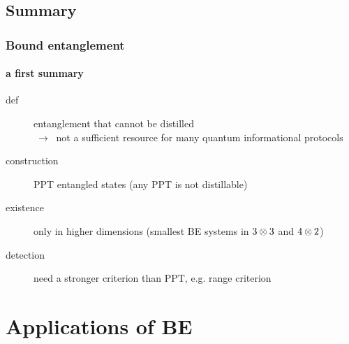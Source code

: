 \documentclass[compress,notes=hide]{beamer}
\begin{document}
\subsection{Summary}

\begin{frame}
\frametitle{Bound entanglement}
\framesubtitle{a first summary}

\begin{description}
  \item[def] entanglement that cannot be distilled \\ \pause $\ \rightarrow \ $ not a sufficient resource for many quantum informational protocols \pause
  \item[construction] PPT entangled states (any PPT is not distillable) \pause
  \item[existence] only in higher dimensions (smallest BE systems in $3\otimes 3$ and $4\otimes 2$) \pause
  \item[detection] need a stronger criterion than PPT, e.g. range criterion
\end{description}

\end{frame}

\section[Applications]{Applications of BE}
\end{document}

